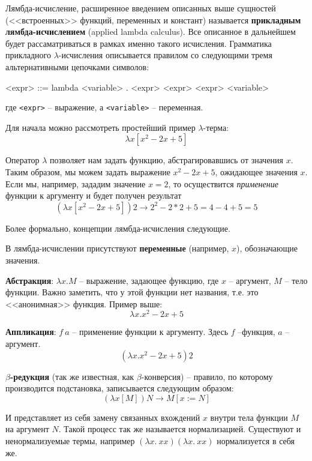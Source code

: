 \documentclass[a4paper,14pt]{extreport} %
\begin{document}
Лямбда-исчисление, расширенное введением описанных выше сущностей (<<встроенных>> функций, переменных и констант) называется \textbf{прикладным лямбда-исчислением} (applied lambda calculus). Все описанное в дальнейшем будет рассаматриваться в рамках именно такого исчисления.
Грамматика прикладного $\lambda$-исчисления описывается правилом со следующими тремя альтернативными цепочками символов: \\

\begin{grammar}

<expr> ::= lambda  <variable> .  <expr>
        \alt <expr>  <expr>
        \alt <variable>

\end{grammar}

где \texttt{<expr>} -- выражение, а \texttt{<variable>} -- переменная.

Для начала можно рассмотреть простейший пример $\lambda$-терма:
$$\lambda x[x^2-2x+5]$$

Оператор $\lambda$ позволяет нам задать функцию, абстрагировавшись от значения $x$. Таким образом, мы можем задать выражение $x^2-2x+5$, ожидающее значения $x$. Если мы, например, зададим значение $x=2$, то осуществится \textit{применение} функции к аргументу и будет получен результат
$$(\lambda x[x^2-2x+5])2 \rightarrow 2^2-2*2+5=4-4+5=5$$

Более формально, концепции лямбда-исчисления следующие.

В лямбда-исчислении присутствуют \textbf{переменные} (например, $x$), обозначающие значения.

\textbf{Абстракция}: $\lambda x.M$ -- выражение, задающее функцию, где $x$ -- аргумент, $M$ -- тело функции. Важно заметить, что у этой функции нет названия, т.е. это <<анонимная>> функция. Пример выше:
$$\lambda x . x^2-2x+5$$

\textbf{Аппликация}: $f \ a$ -- применение функции к аргументу. Здесь $f$ --функция, $a$ -- аргумент.
$$(\lambda x . x^2-2x+5)2$$

\textbf{$\beta$-редукция} (так же известная, как $\beta$-конверсия) -- правило, по которому производится подстановка, записывается следующим образом:
$$(\lambda x[M])N \rightarrow M[x:=N]$$

И представляет из себя замену связанных вхождений $x$ внутри тела функции $M$ на аргумент $N$. Такой процесс так же называется нормализацией. Существуют и ненормализуемые термы, например $(\lambda x . \ xx)(\lambda x . \ xx)$ нормализуется в себя же.
\end{document}
